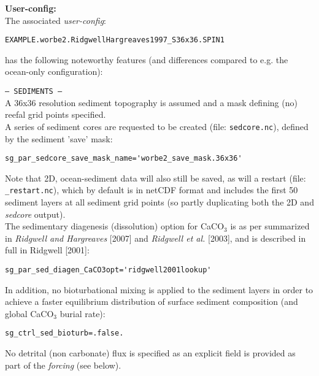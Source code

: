 \documentclass[10pt,twoside]{article}
\begin{document}
\noindent \textbf{User-config:} 
\\ The associated \textit{user-config}:
\vspace{-10pt}\begin{verbatim}EXAMPLE.worbe2.RidgwellHargreaves1997_S36x36.SPIN1\end{verbatim}\vspace{-10pt}
has the following noteworthy features (and differences compared to e.g. the ocean-only configuration):
\begin{compactitem}
                \item \texttt{--- SEDIMENTS ---}
                \\ A 36x36 resolution sediment topography is assumed and a mask defining (no) reefal grid points specified.
                \\ A series of sediment cores are requested to be created (file: \texttt{sedcore.nc}), defined by the sediment 'save' mask:
\vspace{-5pt}\begin{verbatim}
sg_par_sedcore_save_mask_name='worbe2_save_mask.36x36'
                \end{verbatim}\vspace{-5pt}
Note that 2D, ocean-sediment data will also still be saved, as will a restart (file: \texttt{\_restart.nc}), which by default is in netCDF format and includes the first 50 sediment layers at all sediment grid points (so partly duplicating both the 2D and \textit{sedcore} output).
                \\ The sedimentary diagenesis (dissolution) option for CaCO$_{3}$ is as per summarized in \textit{Ridgwell and Hargreaves} [2007] and \textit{Ridgwell et al.} [2003], and is described in full in Ridgwell [2001]:
\vspace{-5pt}\begin{verbatim}
sg_par_sed_diagen_CaCO3opt='ridgwell2001lookup'
                \end{verbatim}\vspace{-5pt}
                In addition, no bioturbational mixing is applied to the sediment layers in order to achieve a faster equilibrium distribution of surface sediment composition (and global CaCO$_{3}$ burial rate):
                \vspace{-5pt}\begin{verbatim}
sg_ctrl_sed_bioturb=.false.
                \end{verbatim}\vspace{-5pt}
No detrital (non carbonate) flux is specified as an explicit field is provided as part of the \textit{forcing} (see below).

\end{compactitem}
\end{document}
